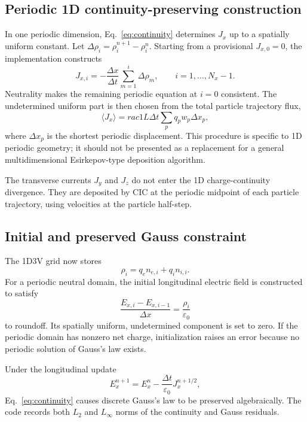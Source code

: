 \documentclass[11pt,a4paper]{article}
\newcommand{\epsz}{\varepsilon_0}
\begin{document}
\subsection{Periodic 1D continuity-preserving construction}

In one periodic dimension, Eq.~\eqref{eq:continuity} determines $J_x$ up to a
spatially uniform constant.  Let
$\Delta\rho_i=\rho_i^{n+1}-\rho_i^n$.  Starting from a provisional
$J_{x,0}=0$, the implementation constructs
\begin{equation}
  J_{x,i}=-\frac{\Delta x}{\Delta t}
      \sum_{m=1}^{i}\Delta\rho_m,
  \qquad i=1,\ldots,N_x-1.
\end{equation}
Neutrality makes the remaining periodic equation at $i=0$ consistent.  The
undetermined uniform part is then chosen from the total particle trajectory
flux,
\begin{equation}
  \langle J_x\rangle=rac{1}{L\Delta t}
       \sum_p q_pw_p\Delta x_p,
\end{equation}
where $\Delta x_p$ is the shortest periodic displacement.  This procedure is
specific to 1D periodic geometry; it should not be presented as a replacement
for a general multidimensional Esirkepov-type deposition algorithm.

The transverse currents $J_y$ and $J_z$ do not enter the 1D charge-continuity
divergence.  They are deposited by CIC at the periodic midpoint of each
particle trajectory, using velocities at the particle half-step.

\subsection{Initial and preserved Gauss constraint}

The 1D3V grid now stores
\begin{equation}
  \rho_i=q_en_{e,i}+q_in_{i,i}.
\end{equation}
For a periodic neutral domain, the initial longitudinal electric field is
constructed to satisfy
\begin{equation}
  \frac{E_{x,i}-E_{x,i-1}}{\Delta x}=\frac{\rho_i}{\epsz}
\end{equation}
to roundoff.  Its spatially uniform, undetermined component is set to zero.
If the periodic domain has nonzero net charge, initialization raises an error
because no periodic solution of Gauss's law exists.

Under the longitudinal update
\begin{equation}
 E_x^{n+1}=E_x^n-\frac{\Delta t}{\epsz}J_x^{n+1/2},
\end{equation}
Eq.~\eqref{eq:continuity} causes discrete Gauss's law to be preserved
algebraically.  The code records both $L_2$ and $L_\infty$ norms of the
continuity and Gauss residuals.
\end{document}
